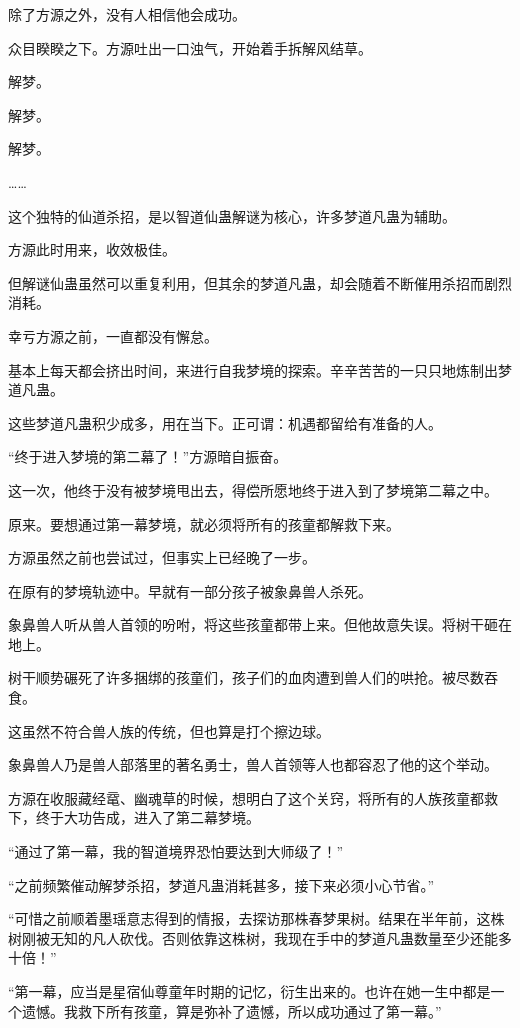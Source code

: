 \begin{this_body}
除了方源之外，没有人相信他会成功。

众目睽睽之下。方源吐出一口浊气，开始着手拆解风结草。

解梦。

解梦。

解梦。

……

这个独特的仙道杀招，是以智道仙蛊解谜为核心，许多梦道凡蛊为辅助。

方源此时用来，收效极佳。

但解谜仙蛊虽然可以重复利用，但其余的梦道凡蛊，却会随着不断催用杀招而剧烈消耗。

幸亏方源之前，一直都没有懈怠。

基本上每天都会挤出时间，来进行自我梦境的探索。辛辛苦苦的一只只地炼制出梦道凡蛊。

这些梦道凡蛊积少成多，用在当下。正可谓：机遇都留给有准备的人。

“终于进入梦境的第二幕了！”方源暗自振奋。

这一次，他终于没有被梦境甩出去，得偿所愿地终于进入到了梦境第二幕之中。

原来。要想通过第一幕梦境，就必须将所有的孩童都解救下来。

方源虽然之前也尝试过，但事实上已经晚了一步。

在原有的梦境轨迹中。早就有一部分孩子被象鼻兽人杀死。

象鼻兽人听从兽人首领的吩咐，将这些孩童都带上来。但他故意失误。将树干砸在地上。

树干顺势碾死了许多捆绑的孩童们，孩子们的血肉遭到兽人们的哄抢。被尽数吞食。

这虽然不符合兽人族的传统，但也算是打个擦边球。

象鼻兽人乃是兽人部落里的著名勇士，兽人首领等人也都容忍了他的这个举动。

方源在收服藏经鼋、幽魂草的时候，想明白了这个关窍，将所有的人族孩童都救下，终于大功告成，进入了第二幕梦境。

“通过了第一幕，我的智道境界恐怕要达到大师级了！”

“之前频繁催动解梦杀招，梦道凡蛊消耗甚多，接下来必须小心节省。”

“可惜之前顺着墨瑶意志得到的情报，去探访那株春梦果树。结果在半年前，这株树刚被无知的凡人砍伐。否则依靠这株树，我现在手中的梦道凡蛊数量至少还能多十倍！”

“第一幕，应当是星宿仙尊童年时期的记忆，衍生出来的。也许在她一生中都是一个遗憾。我救下所有孩童，算是弥补了遗憾，所以成功通过了第一幕。”


\end{this_body}
